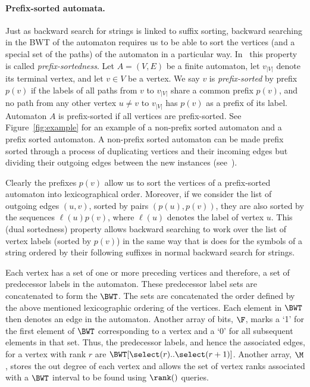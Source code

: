 \documentclass[doctor]{thesis}
\begin{document}
\paragraph{Prefix-sorted automata.}
Just as backward search for strings is linked to suffix sorting, backward searching in the BWT of the automaton 
requires us to be able to sort the vertices (and a special set of the paths) of the automaton in a particular 
way. In~\cite{dag_method} this property is called {\em prefix-sortedness}. Let $A = (V,E)$ be a finite automaton, 
let $v_{|V|}$ denote its terminal vertex, and let $v \in V$ be a vertex. We say $v$ is {\em prefix-sorted} by 
prefix $p(v)$ if the labels of all paths from $v$ to $v_{|V|}$ share a common prefix $p(v)$, and no path from any 
other vertex $u \ne v$ to $v_{|V|}$ has $p(v)$ as a prefix of its label. Automaton $A$ is prefix-sorted if all 
vertices are prefix-sorted. See Figure~\ref{fig:example} for an example of a non-prefix sorted automaton and a 
prefix sorted automaton. A non-prefix sorted automaton can be made prefix sorted through a process of duplicating 
vertices and their incoming edges but dividing their outgoing edges between the new instances (see~\cite{dag_method}).

Clearly the prefixes $p(v)$ allow us to sort the vertices of a prefix-sorted automaton into lexicographical 
order. Moreover, if we consider the list of outgoing edges $(u,v)$, sorted by pairs $(p(u),p(v))$, they are
also sorted by the sequences $\ell(u)p(v)$, where $\ell(u)$ denotes the label of vertex $u$. This (dual sortedness)
property allows backward searching to work over the list of vertex labels (sorted by $p(v)$) in the same way
that is does for the symbols of a string ordered by their following suffixes in normal backward search for 
strings.

Each vertex has a set of one or more preceding vertices and therefore, a set of predecessor labels in the 
automaton. These predecessor label sets are concatenated to form the $\BWT$. The sets are concatenated the 
order defined by the above mentioned lexicographic ordering of the vertices. Each element in $\BWT$ then 
denotes an edge in the automaton. Another array of bits, $\F$, marks a `1' for the first element of $\BWT$ 
corresponding to a vertex and a `0' for all subsequent elements in that set. Thus, the predecessor labels, 
and hence the associated edges, for a vertex with rank $r$ are $\BWT[\select(r)..\select(r+1)]$. Another 
array, $\M$, stores the out degree of each vertex and allows the set of vertex ranks associated with a $\BWT$ 
interval to be found using $\rank()$ queries.
\end{document}
